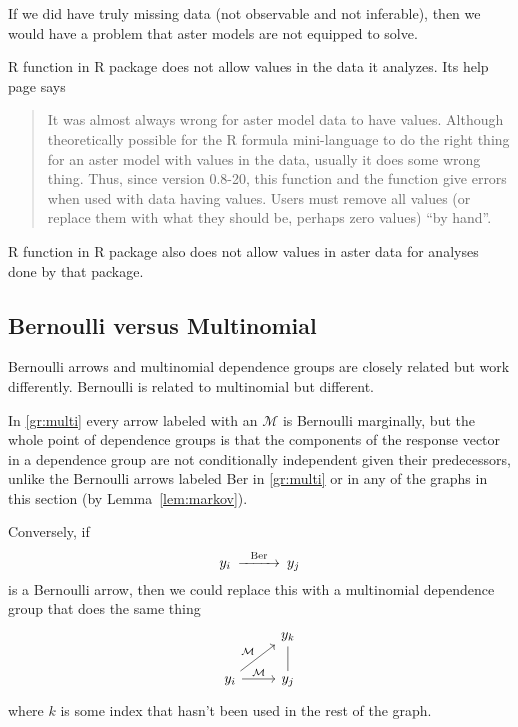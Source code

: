 If we did have truly missing data (not observable and not inferable),
then we would have a problem that aster models are not equipped to solve.

R function  in R package  does not allow 
values in the data it analyzes.  Its help page says
\begin{quotation}
     It was almost always wrong for aster model data to have 
     values. Although theoretically possible for the R formula
     mini-language to do the right thing for an aster model with 
     values in the data, usually it does some wrong thing.  Thus, since
     version 0.8-20, this function and the  function give
     errors when used with data having  values.  Users must remove
     all  values (or replace them with what they should be, perhaps
     zero values) ``by hand''.
\end{quotation}
R function  in R package  also does not
allow  values in aster data for analyses done by that package.

\subsection{Bernoulli versus Multinomial}

Bernoulli arrows and multinomial dependence groups are closely related but
work differently.  Bernoulli is related to multinomial but different.

In \eqref{gr:multi} every arrow labeled with an $\mathcal{M}$ is Bernoulli
marginally, but the whole point of dependence groups is that the components
of the response vector in a dependence group are not
conditionally independent given their predecessors, unlike the Bernoulli
arrows labeled Ber in \eqref{gr:multi} or in any of the graphs in this
section (by Lemma~\ref{lem:markov}).

Conversely, if
$$
\begin{CD}
   y_i @>\text{Ber}>> y_j
\end{CD}
$$
is a Bernoulli arrow, then we could replace this with a multinomial dependence
group that does the same thing
$$
\begin{tikzcd}
  \hphantom{1} & y_k
  \\
  y_i
  \arrow{r}{\mathcal{M}}
  \arrow{ru}{\mathcal{M}}
  & y_j
  \arrow[dash]{u}
\end{tikzcd}
$$
where $k$ is some index that hasn't been used in the rest of the graph.

